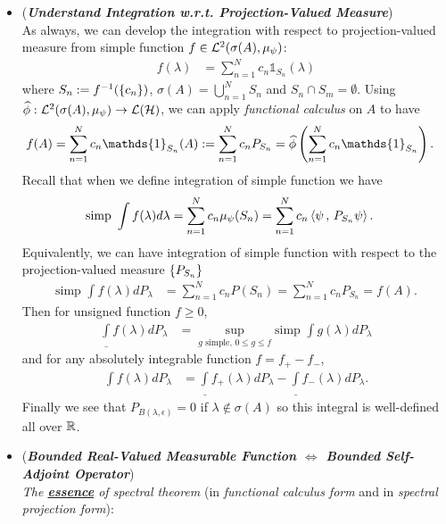 \documentclass[11pt]{article}
\begin{document}
\begin{itemize}
\item \begin{remark} (\textbf{\emph{Understand Integration w.r.t. Projection-Valued Measure}})\\
As always, we can develop the integration with respect to projection-valued measure from simple function $f \in  {\mathcal L}^2(\sigma(A), \mu_{\psi})$:
\begin{align*}
f(\lambda) &= \sum_{n=1}^{N} c_n\mathds{1}_{S_n}(\lambda)
\end{align*} where $S_n := f^{-1}(\left\{c_n\right\})$, $\sigma(A) = \bigcup_{n=1}^{N}S_n$ and $S_n \cap S_m = \emptyset$. Using $\widehat{\phi}: {\mathcal L}^2(\sigma(A), \mu_{\psi}) \to {\mathcal L}({\mathcal H})$, we can apply \emph{functional calculus} on $A$ to have
\begin{align*}
f(A) &= \sum_{n=1}^{N} c_n \mathds{1}_{S_n}(A) := \sum_{n=1}^{N} c_n P_{S_n}= \widehat{\phi}\paren{ \sum_{n=1}^{N}c_n \mathds{1}_{S_n}}.
\end{align*}
Recall that when we define integration of simple function we have
\begin{align*}
\text{simp }\int f(\lambda) d\lambda &=  \sum_{n=1}^{N}c_n \mu_{\psi}(S_n) = \sum_{n=1}^{N} c_n \left\langle \psi\,,\, P_{S_n}\psi \right\rangle.
\end{align*} Equivalently, we can have integration of simple function with respect to the projection-valued measure $\left\{P_{S_n}\right\}$
\begin{align*}
\text{simp }\int f(\lambda) dP_{\lambda} &=  \sum_{n=1}^{N}c_n P(S_n) = \sum_{n=1}^{N}c_n P_{S_n} = f(A).
\end{align*}
Then for unsigned function $f \ge 0$,
\begin{align*}
\underline{\int} f(\lambda) dP_{\lambda} &= \sup_{g \text{ simple, } 0 \le g\le f}\text{simp }\int g(\lambda) dP_{\lambda}
\end{align*} and for any absolutely integrable function $f = f_{+} - f_{-}$, 
\begin{align*}
\int f(\lambda) dP_{\lambda}  &= \underline{\int} f_{+}(\lambda) dP_{\lambda}  - \underline{\int} f_{-}(\lambda) dP_{\lambda}.
\end{align*}Finally we see that $P_{B(\lambda, \epsilon)} = 0$ if $\lambda \not\in \sigma(A)$ so this integral is well-defined all over ${\mathbb R}$.
\end{remark}

\item \begin{remark} (\emph{\textbf{Bounded Real-Valued Measurable Function $\Leftrightarrow$ Bounded Self-Adjoint Operator}}) \citep{halmos2017introduction}\\
\emph{The \underline{\textbf{essence}} of spectral theorem} (in \emph{functional calculus form} and in \emph{spectral projection form}):


\end{remark}
\end{itemize}
\end{document}
